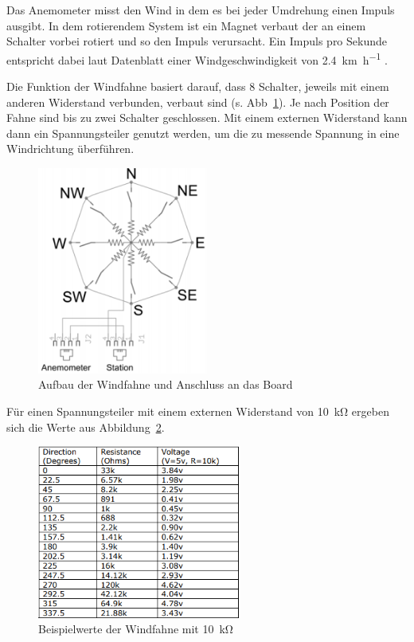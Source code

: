 Das Anemometer misst den Wind in dem es bei jeder Umdrehung einen Impuls ausgibt. In dem rotierendem System ist ein Magnet verbaut der an einem Schalter vorbei rotiert und so den Impuls verursacht. Ein Impuls pro Sekunde entspricht dabei laut Datenblatt einer Windgeschwindigkeit von \SI{2.4}{\km\per\hour} \cite{argent_data_systems}.

Die Funktion der Windfahne basiert darauf, dass 8 Schalter, jeweils mit einem anderen Widerstand verbunden, verbaut sind (s. Abb~\ref{fig:Wind_Plan}). Je nach Position der Fahne sind bis zu zwei Schalter geschlossen. Mit einem externen Widerstand kann dann ein Spannungsteiler genutzt werden, um die zu messende Spannung in eine Windrichtung überführen. 

\begin{figure}[H]
  \centering
  \includegraphics[width=0.5\textwidth]{./img/Wind_Plan.png}
  \caption{Aufbau der Windfahne und Anschluss an das Board\cite{ds_wind}}\label{fig:Wind_Plan}
\end{figure}

Für einen Spannungsteiler mit einem externen Widerstand von \SI{10}{\kilo\ohm} ergeben sich die Werte aus Abbildung~\ref{fig:Wind_Werte}.

\begin{figure}[H]
  \centering
  \includegraphics[width=0.6\textwidth]{./img/Wind_Werte.png}
  \caption{Beispielwerte der Windfahne mit \SI{10}{\kilo\ohm} \citep{argent_data_systems}}\label{fig:Wind_Werte}
\end{figure}

